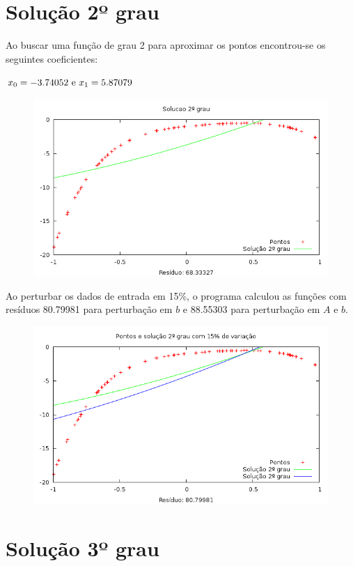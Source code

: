 \newpage
\section{Solução 2º grau}

Ao buscar uma função de grau 2 para aproximar os pontos encontrou-se os seguintes 
coeficientes:

\(x_0 = -3.74052 ~$e$~  x_1 = 5.87079 \)

\begin{figure}[h]
\centering
\includegraphics[scale=0.7]{sol2grau}
\end{figure}

Ao perturbar os dados de entrada em 15\%, o programa calculou as funções 
com resíduos 80.79981 para perturbação em $b$ e 88.55303 para perturbação em $A$ e $b$.

\begin{figure}[h]
\centering
\includegraphics[scale=0.7]{sol2grau_var}
\end{figure}


\newpage
\section{Solução 3º grau}

